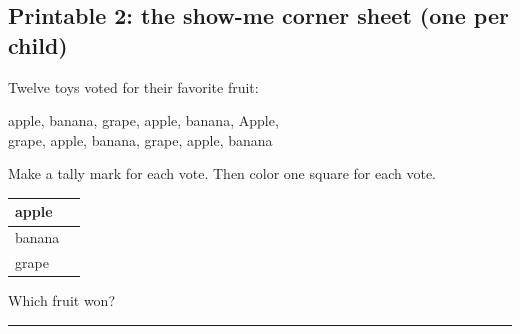 \clearpage
\subsection*{Printable 2: the show-me corner sheet (one per child)}
Twelve toys voted for their favorite fruit:
\begin{center}
\large apple, banana, grape, apple, banana, Apple,\\ grape, apple, banana, grape, apple, banana
\end{center}
Make a tally mark for each vote. Then color one square for each vote.
\begin{center}
\Large\renewcommand{\arraystretch}{1.6}
\begin{tabular}{|p{3cm}|p{6cm}|}
\hline
apple & \\ \hline
banana & \\ \hline
grape & \\ \hline
\end{tabular}
\end{center}
\begin{center}
\end{center}
Which fruit won? \rule{6cm}{0.4pt}
